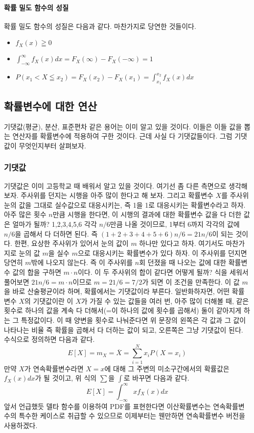\paragraph{확률 밀도 함수의 성질}
확률 밀도 함수의 성질은 다음과 같다. 마찬가지로 당연한 것들이다.
\begin{itemize}
    \item $f_X(x)\geqq 0$
    \item $\int_{-\infty}^{\infty}f_X(x)dx=F_X(\infty)-F_X(-\infty)=1$
    \item $P(x_1<X\leqq x_2)=F_X(x_2)-F_X(x_1)=\int_{x_1}^{x_2}f_X(x)dx$
\end{itemize}
\subsection{확률변수에 대한 연산}
기댓값(평균), 분산, 표준편차 같은 용어는 이미 알고 있을 것이다. 이들은 이들 값을 뽑는 연산자를 확률변수에 적용하여 구한 것이다. 근데 사실 다 기댓값들이다.
그럼 기댓값이 무엇인지부터 살펴보자.
\subsubsection{기댓값}\label{기댓값}
기댓값은 이미 고등학교 때 배워서 알고 있을 것이다. 여기선 좀 다른 측면으로 생각해보자.
주사위를 던지는 시행을 아주 많이 한다고 해 보자. 그리고 확률변수 $X$를 주사위 눈의 값을 그대로 실수값으로 대응시키는, 즉 1을 1로 대응시키는 확률변수라고 하자.
아주 많은 횟수 $n$만큼 시행을 한다면, 이 시행의 결과에 대한 확률변수 값을 다 더한 값은 얼마가 될까? 1,2,3,4,5,6 각각 $n/6$만큼 나올 것이므로, 1부터 6까지 각각의 값에 $n/6$을 곱해서 다 더하면 된다.
즉 $(1+2+3+4+5+6)n/6=21n/6$이 되는 것이다.
한편, 요상한 주사위가 있어서 눈의 값이 $m$ 하나만 있다고 하자. 여기서도 마찬가지로 눈의 값 $m$을 실수 $m$으로 대응시키는 확률변수가 있다 하자. 이 주사위를 던지면 당연히 $m$밖에 나오지 않는다. 즉 이 주사위를 $n$회 던졌을 때 나오는 값에 대한 확률변수 값의 합을 구하면 $m\cdot n$이다.
이 두 주사위의 합이 같다면 어떻게 될까? 식을 세워서 풀어보면 $21n/6 = m\cdot n$이므로 $m=21/6=7/2$가 되면 이 조건을 만족한다. 이 값 $m$을 바로 산술평균이라 하며, 확률에서는 기댓값이라 부른다.
일반화하자면, 어떤 확률변수 $X$의 기댓값이란 이 $X$가 가질 수 있는 값들을 여러 번, 아주 많이 더해볼 때, 같은 횟수로 하나의 값을 계속 다 더해서(=이 하나의 값에 횟수를 곱해서) 둘이 같아지게 하는 그 특정값이다.
이 때 양변을 횟수로 나눠준다면 위 문장의 왼쪽은 각 값과 그 값이 나타나는 비율 즉 확률을 곱해서 다 더하는 값이 되고, 오른쪽은 그냥 기댓값이 된다.
수식으로 정의하면 다음과 같다.
\begin{equation}
    E[X]=m_X=\overline{X}= \sum_{i=1}^{N}x_iP(X=x_i)
\end{equation}
만약 $X$가 연속확률변수라면 $X=x$에 대해 그 주변의 미소구간에서의 확률값은 $f_X(x)dx$가 될 것이고, 위 식의 $\sum$을 $\int$로 바꾸면 다음과 같다.
\begin{equation}
    E[X]=\int_{-\infty}^{\infty}xf_X(x)dx
\end{equation}
앞서 언급했듯 델타 함수를 이용하여 PDF를 표현한다면 이산확률변수는 연속확률변수의 특수한 케이스로 취급할 수 있으므로 이제부터는 웬만하면 연속확률변수 버전을 사용하겠다.
